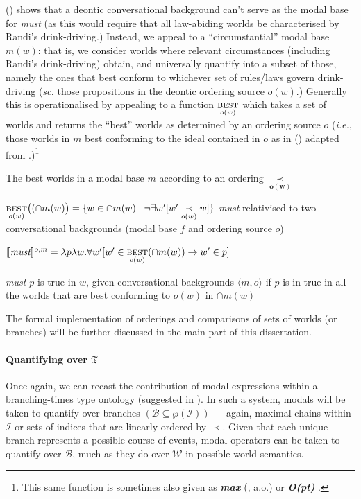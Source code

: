 \documentclass[12pt,dvipsnames]{report}
\providecommand{\denote}[2][]{\ensuremath{\llbracket{#2}\rrbracket^{#1}}}
\begin{document}
\noindent(\lastx) shows that a deontic conversational background can't serve as the modal base for \textit{must} (as this would require that all law-abiding worlds be characterised by Randi's drink-driving.) Instead, we appeal to a ``circumstantial'' modal base $ m(w) $: that is, we consider worlds where relevant circumstances (including Randi's drink-driving) obtain, and universally quantify into a subset of those, namely the ones that best conform to whichever set of rules/laws govern drink-driving (\textit{sc.} those propositions in the deontic ordering source $ o(w) $.) Generally this is operationalised by appealing to a function $ \underset{o(w)}{\textsc{best}}$ which takes a set of worlds and returns the ``best'' worlds as determined by an ordering source $ o $ (\textit{i.e.}, those worlds in $ m $ best conforming to the ideal contained in $ o $ as in (\nextx) adapted from \citealp[61]{VonFintel2011}.)\footnote{This same function is sometimes also given as \textbf{\textit{max}} (\citealp[e.g.][]{Hacquard2006,VonFintel2008,VonFintel2011}, a.o.) or \textbf{\textit{O(pt)}} \citep[247]{Schwager2006}.} 

\ex The best worlds in a modal base $ m $ according to an ordering $\boldsymbol{\underset{o(w)}{\prec}}$

$ \underset{o(w)}{\textsc{best}}\big((\cap m(w)\big)=\{w\in\cap m(w)\mid \neg\exists w'[w'\underset{o(w)}{\prec}w]\}$\label{ord-source}\xe
\pex \textit{must} relativised to two conversational backgrounds (modal base $ f $ and ordering source $ o $)

$\denote[o,m]{\textit{must}}=\lambda p\lambda w.\forall w'[w'\in\underset{o(w)}{\textsc{best}}(\cap m(w))\to w'\in p] $

\textit{must $ p $} is true in $ w $, given conversational backgrounds $ \langle{m,o}\rangle $ if $ p $ is in true in all the worlds that are best conforming to $ o(w) $ in $ \cap m(w) $
\xe





The formal implementation of orderings and comparisons of sets of worlds (or branches) will be further discussed in the main part of this dissertation.

\paragraph{Quantifying over $ \mathfrak{T} $}

Once again, we can recast the contribution of modal expressions within a branching-times type ontology (suggested in \citealp[594, note 9]{VonPrince2019}). In such a system, modals will be taken to quantify over branches $ (\mathcal{B\subseteq\wp(I)})$ --- again, maximal chains within $ \mathcal I $ or sets of indices that are linearly ordered by $ \prec $. Given that each unique branch represents a possible course of events, modal operators can be taken to quantify over $ \mathcal B $, much as they do over $ \mathcal W $ in possible world semantics.
\end{document}
